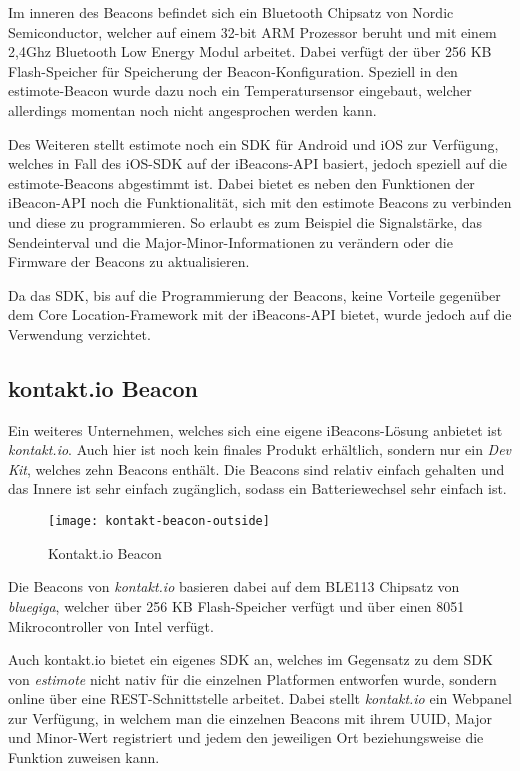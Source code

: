 Im inneren des Beacons befindet sich ein Bluetooth Chipsatz von Nordic Semiconductor, welcher auf einem 32-bit ARM Prozessor beruht und mit einem 2,4Ghz Bluetooth Low Energy Modul arbeitet. Dabei verfügt der über 256 KB Flash-Speicher für Speicherung der Beacon-Konfiguration.
Speziell in den estimote-Beacon wurde dazu noch ein Temperatursensor eingebaut, welcher allerdings momentan noch nicht angesprochen werden kann.

Des Weiteren stellt estimote noch ein SDK für Android und iOS zur Verfügung, welches in Fall des iOS-SDK auf der iBeacons-API basiert, jedoch speziell auf die estimote-Beacons abgestimmt ist. 
Dabei bietet es neben den Funktionen der iBeacon-API noch die Funktionalität, sich mit den estimote Beacons zu verbinden und diese zu programmieren. So erlaubt es zum Beispiel die Signalstärke, das Sendeinterval und die Major-Minor-Informationen zu verändern oder die Firmware der Beacons zu aktualisieren.

Da das SDK, bis auf die Programmierung der Beacons, keine Vorteile gegenüber dem Core Location-Framework mit der iBeacons-API bietet, wurde jedoch auf die Verwendung verzichtet.

\subsection{kontakt.io Beacon}
\label{sec:dataandmeasurement:mobilebeacon:kontaktio}
Ein weiteres Unternehmen, welches sich eine eigene iBeacons-Lösung anbietet ist \emph{kontakt.io}. Auch hier ist noch kein finales Produkt erhältlich, sondern nur ein \emph{Dev Kit}, welches zehn Beacons enthält. 
Die Beacons sind relativ einfach gehalten und das Innere ist sehr einfach zugänglich, sodass ein Batteriewechsel sehr einfach ist.


\begin{figure}[htb!]
		\centering
	\texttt{[image: kontakt-beacon-outside]}
	\caption{Kontakt.io Beacon}
	\label{kontakt-beacon-outside}
\end{figure}

Die Beacons von \emph{kontakt.io} basieren dabei auf dem BLE113 Chipsatz von \emph{bluegiga}, welcher über 256 KB Flash-Speicher verfügt und über einen 8051 Mikrocontroller von Intel verfügt.


Auch kontakt.io bietet ein eigenes SDK an, welches im Gegensatz zu dem SDK von \emph{estimote} nicht nativ für die einzelnen Platformen entworfen wurde, sondern online über eine REST-Schnittstelle arbeitet.
Dabei stellt \emph{kontakt.io} ein Webpanel zur Verfügung, in welchem man die einzelnen Beacons mit ihrem UUID, Major und Minor-Wert registriert und jedem den jeweiligen Ort beziehungsweise die Funktion zuweisen kann. 


